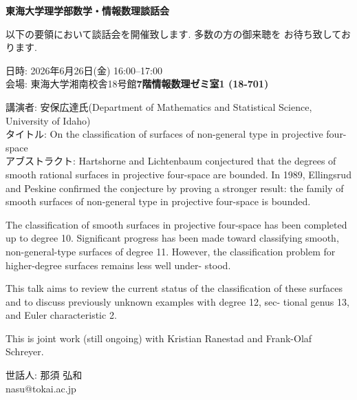 \documentclass[10pt]{jarticle}
\title{}
\author{}
\date{}
\theoremstyle{definition}
\begin{document}

\begin{center}
 {\bf \Huge 東海大学理学部数学・情報数理談話会}
\end{center}

\bigskip

{\Large
以下の要領において談話会を開催致します. 多数の方の御来聴を
お待ち致しております. 

\bigskip

\noindent
日時: 2026年6月26日(金) 16:00--17:00\\
\smallskip
会場: 東海大学湘南校舎18号館{\bf 7階情報数理ゼミ室1 (18-701)}\\

\medskip

\noindent
講演者: 
安保広達氏(Department of Mathematics and Statistical Science, University of Idaho)\\
\smallskip
タイトル: 
On the classification of surfaces of non-general type in projective four-space\\

\noindent
アブストラクト:
Hartshorne and Lichtenbaum conjectured that the degrees
of smooth rational surfaces in projective four-space are bounded. In 1989,
Ellingsrud and Peskine confirmed the conjecture by proving a stronger
result: the family of smooth surfaces of non-general type in projective
four-space is bounded.

The classification of smooth surfaces in projective four-space has been
completed up to degree 10. Significant progress has been made toward
classifying smooth, non-general-type surfaces of degree 11. However, the
classification problem for higher-degree surfaces remains less well under-
stood.

This talk aims to review the current status of the classification of these
surfaces and to discuss previously unknown examples with degree 12, sec-
tional genus 13, and Euler characteristic 2.

This is joint work (still ongoing) with Kristian Ranestad and Frank-Olaf
Schreyer.

\vskip 2cm

\begin{flushright}
  世話人: 那須 弘和\\
  nasu@tokai.ac.jp
\end{flushright}
}
\end{document}
